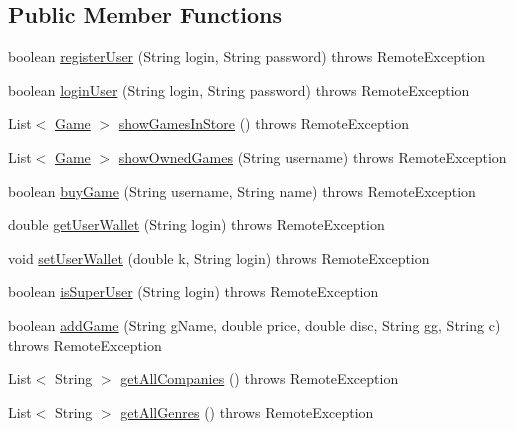 \subsection*{Public Member Functions}
\begin{DoxyCompactItemize}
\item 
boolean \hyperlink{interfacees_1_1deusto_1_1server_1_1remote_1_1_i_remote_aea9a185d69da02d134443a3802a20b32}{register\+User} (String login, String password)  throws Remote\+Exception
\item 
boolean \hyperlink{interfacees_1_1deusto_1_1server_1_1remote_1_1_i_remote_a19acdbd6565b0f00cbe860a3316071ad}{login\+User} (String login, String password)  throws Remote\+Exception
\item 
List$<$ \hyperlink{classes_1_1deusto_1_1server_1_1db_1_1data_1_1_game}{Game} $>$ \hyperlink{interfacees_1_1deusto_1_1server_1_1remote_1_1_i_remote_a091249da31b567c1be29e07085d3ff18}{show\+Games\+In\+Store} ()  throws Remote\+Exception
\item 
List$<$ \hyperlink{classes_1_1deusto_1_1server_1_1db_1_1data_1_1_game}{Game} $>$ \hyperlink{interfacees_1_1deusto_1_1server_1_1remote_1_1_i_remote_aaaf6af5906c81cbd7b3b190a70ead98b}{show\+Owned\+Games} (String username)  throws Remote\+Exception
\item 
boolean \hyperlink{interfacees_1_1deusto_1_1server_1_1remote_1_1_i_remote_ad2e6ee616bdc780b4057e63bf2ae8be7}{buy\+Game} (String username, String name)  throws Remote\+Exception
\item 
double \hyperlink{interfacees_1_1deusto_1_1server_1_1remote_1_1_i_remote_a53305dbc72d910c932e66e2c27c5e1bb}{get\+User\+Wallet} (String login)  throws Remote\+Exception
\item 
void \hyperlink{interfacees_1_1deusto_1_1server_1_1remote_1_1_i_remote_a6252daae1e76aee233294482f661160a}{set\+User\+Wallet} (double k, String login)  throws Remote\+Exception
\item 
boolean \hyperlink{interfacees_1_1deusto_1_1server_1_1remote_1_1_i_remote_a488f8b57271876e219af445345428d73}{is\+Super\+User} (String login)  throws Remote\+Exception
\item 
boolean \hyperlink{interfacees_1_1deusto_1_1server_1_1remote_1_1_i_remote_a991909db4d26d5be67bb3e0bcb501c7e}{add\+Game} (String g\+Name, double price, double disc, String gg, String c)  throws Remote\+Exception
\item 
List$<$ String $>$ \hyperlink{interfacees_1_1deusto_1_1server_1_1remote_1_1_i_remote_a79aad360068d216b63b8afadcc6bcc92}{get\+All\+Companies} ()  throws Remote\+Exception
\item 
List$<$ String $>$ \hyperlink{interfacees_1_1deusto_1_1server_1_1remote_1_1_i_remote_a90995befbd81e0781056f75645997fe9}{get\+All\+Genres} ()  throws Remote\+Exception
\end{DoxyCompactItemize}


